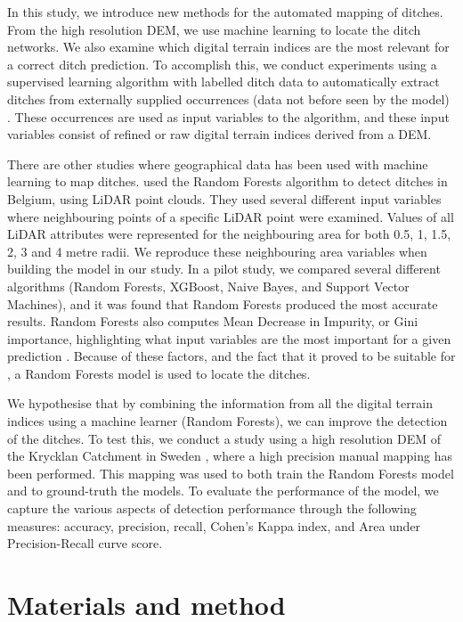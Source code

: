 \documentclass[]{interact}
\theoremstyle{plain}%
\theoremstyle{definition}
\theoremstyle{remark}
\begin{document}
In this study, we introduce new methods for the automated mapping of ditches. From the high resolution DEM, we use machine learning to locate the ditch networks. We also examine which digital terrain indices are the most relevant for a correct ditch prediction. To accomplish this, we conduct experiments using a supervised learning algorithm with labelled ditch data to automatically extract ditches from externally supplied occurrences (data not before seen by the model) \citep{kotsiantis}. These occurrences are used as input variables to the algorithm, and these input variables consist of refined or raw digital terrain indices derived from a DEM.

There are other studies where geographical data has been used with machine learning to map ditches. \citet{roelens} used the Random Forests algorithm to detect ditches in Belgium, using LiDAR point clouds. They used several different input variables where neighbouring points of a specific LiDAR point were examined. Values of all LiDAR attributes were represented for the neighbouring area for both 0.5, 1, 1.5, 2, 3 and 4 metre radii. We reproduce these neighbouring area variables when building the model in our study. In a pilot study, we compared several different algorithms (Random Forests, XGBoost, Naive Bayes, and Support Vector Machines), and it was found that Random Forests produced the most accurate results. Random Forests also computes Mean Decrease in Impurity, or Gini importance, highlighting what input variables are the most important for a given prediction \citep{gini}. Because of these factors, and the fact that it proved to be suitable for \citet{roelens}, a Random Forests model is used to locate the ditches.

We hypothesise that by combining the information from all the digital terrain indices using a machine learner (Random Forests), we can improve the detection of the ditches. To test this, we conduct a study using a high resolution DEM of the Krycklan Catchment in Sweden \citep{krycklancatchment},  where a high precision manual mapping has been performed. This mapping was used to both train the Random Forests model and to ground-truth the models. To evaluate the performance of the model, we capture the various aspects of detection performance through the following measures: accuracy, precision, recall, Cohen’s Kappa index, and Area under Precision-Recall curve score.

\section{Materials and method}
\label{method}
\end{document}
